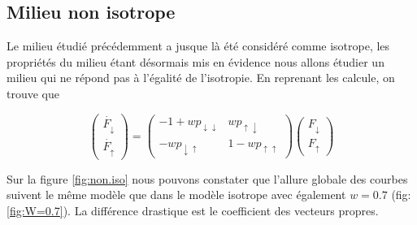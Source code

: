 \documentclass[12pt]{article}
\begin{document}
\subsection{Milieu non isotrope}
Le milieu étudié précédemment a jusque là été considéré comme isotrope, les propriétés du milieu étant désormais mis en évidence nous allons étudier un milieu qui ne répond pas à l'égalité de l'isotropie. En reprenant les calcule, on trouve que

\begin{equation}
    \begin{pmatrix}
        \dot{F_{\downarrow}}\\
        \dot{F_{\uparrow}}
    \end{pmatrix}=
    \begin{pmatrix}
        -1+wp_{{\downarrow}{\downarrow}} & wp_{{\uparrow}{\downarrow}} \\
         -w p_{{\downarrow}{\uparrow}} & 1-wp_{{\uparrow}{\uparrow}} 
    \end{pmatrix}
    \begin{pmatrix}
        F_{\downarrow}\\
        F_{\uparrow}
    \end{pmatrix}
    \label{eq:matrice non iso}
\end{equation}\par
Sur la figure \ref{fig:non.iso} nous pouvons constater que l'allure globale des courbes suivent le même modèle que dans le modèle isotrope avec également $w=0.7$ (fig: \ref{fig:W=0.7}).
La différence drastique est le coefficient des vecteurs propres.
\end{document}

